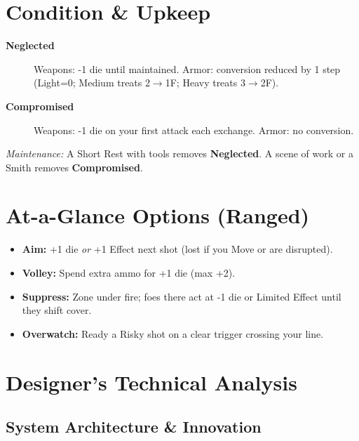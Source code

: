 \section{Condition \& Upkeep}
\label{app:condition}
\begin{description}
  \item[\textbf{Neglected}] Weapons: -1 die until maintained. Armor: conversion reduced by 1 step (Light=0; Medium treats 2$\rightarrow$1F; Heavy treats 3$\rightarrow$2F).
  \item[\textbf{Compromised}] Weapons: -1 die on your first attack each exchange. Armor: no conversion.
\end{description}
\noindent\emph{Maintenance:} A Short Rest with tools removes \textbf{Neglected}. A scene of work or a Smith removes \textbf{Compromised}.

\section{At-a-Glance Options (Ranged)}
\label{app:ranged-at-a-glance}
\begin{itemize}
  \item \textbf{Aim:} +1 die \emph{or} +1 Effect next shot (lost if you Move or are disrupted).
  \item \textbf{Volley:} Spend extra ammo for +1 die (max +2).
  \item \textbf{Suppress:} Zone under fire; foes there act at -1 die or Limited Effect until they shift cover.
  \item \textbf{Overwatch:} Ready a Risky shot on a clear trigger crossing your line.
\end{itemize}


\section{Designer’s Technical Analysis}
\label{appendix:technical-analysis}

\subsection{System Architecture \& Innovation}

